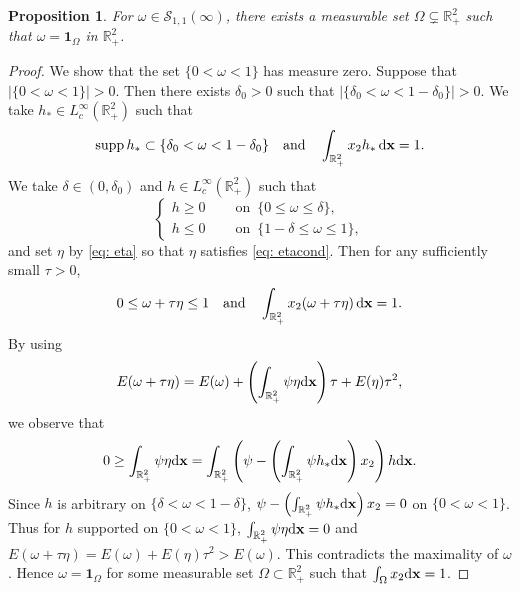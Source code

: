 \documentclass[11pt]{amsart}
\newtheorem{proposition}[theorem]{Proposition}
\theoremstyle{definition}
\theoremstyle{definition}
\numberwithin{equation}{section}
\newcommand{\supp}{{\mathrm{supp}}\,}
\newcommand{\0}{\emptyset}
\newcommand{\bfx}{{\bf x}}
\newcommand{\bbR}{\mathbb R}
\newcommand{\calS}{\mathcal S}
\newcommand{\dd}{\mathrm{d}}
\begin{document}
			
			\begin{proposition}\label{lem_EL_patch}
				For $\omega \in \calS_{1,1}(\infty)$, there exists a measurable set $\Omega \subsetneq \bbR^2_+$ such that $\omega = \mathbf{1}_{\Omega}$ in $\bbR^2_+$.
			\end{proposition}
			
			\begin{proof}
				We show that the set $\{0 < \omega < 1\}$ has measure zero. Suppose that $\left|\{0<\omega<1\}\right|>0$. Then there exists $\delta_0 > 0$ such that $\left| \{\delta_0 < \omega < 1 - \delta_0\} \right| >0$. We take $h_{*} \in L_c^{\infty}(\bbR^2_+)$ such that 
				$$
				\supp{h_{*}} \subset \{ \delta_0 < \omega < 1 - \delta_0\} \quad \textrm{and} \quad \int_{\bbR^2_+} x_2 h_{*} \, \dd \bfx = 1.
				$$ 
				We take $\delta \in (0,\delta_0)$ and $h \in L_c^{\infty}(\bbR^2_+)$ such that 
				\begin{equation*}
					\left\{
					\begin{aligned}
						h\ge0 \quad &\mbox{ on } \, \{0\le \omega \le \delta\},\\
						h\leq0 \quad &\mbox{ on } \, \{1-\delta \le \omega \le 1 \},
					\end{aligned}
					\right.
				\end{equation*}
				and set $\eta$ by \eqref{eq: eta} so that $\eta$ satisfies \eqref{eq: etacond}. Then for any sufficiently small $\tau> 0$, 
				\[
				0 \le \omega + \tau \eta \le 1 \quad \textrm{and} \quad 
				\int_{\bbR^2_+} x_2(\omega + \tau \eta) \, \dd \bfx=1.
				\]
				By using 
				\begin{align*}
					E(\omega+\tau \eta)=E(\omega)+\left(\int_{\mathbb{R}^{2}_{+}}\psi \eta  \dd \bfx \right)  \tau+E(\eta)\tau^{2},
				\end{align*}
				we observe that 
				\begin{align*}
					0 \ge 
					\int_{\mathbb{R}^{2}_{+}}\psi \eta  \dd \bfx
					=
					\int_{\bbR^2_+}\left( \psi-\left(\int_{\mathbb{R}^{2}_{+}}\psi h_{*}\dd\bfx  \right)x_2\right) h  \dd \bfx.
				\end{align*}
				Since $h$ is arbitrary on $\{\delta<\omega<1-\delta\}$, $\psi-\left(\int_{\mathbb{R}^{2}_{+}}\psi h_{*}\dd\bfx  \right)x_2 = 0$ on $\{0 < \omega < 1 \}$. Thus for $h$ supported on $\{0<\omega<1\}$, $\int_{\mathbb{R}^{2}_{+}}\psi \eta \dd\bfx=0$ and $E(\omega+\tau \eta)=E(\omega)+E(\eta)\tau^{2}>E(\omega)$. This contradicts the maximality of $\omega$. Hence $\omega = \mathbf{1}_{\Omega}$ for some measurable set $\Omega \subset \bbR^2_+$ such that $\int_{\Omega}x_2\dd \bfx=1$.
			\end{proof}
			
\end{document}
